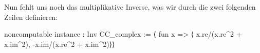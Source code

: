 \documentclass[10pt]{article}
\begin{document}
\noindent Nun fehlt uns noch das multiplikative Inverse, was wir durch die zwei folgenden Zeilen definieren:
\vspace{-0.1cm}
\begin{leancode}
noncomputable instance : Inv CC_complex :=
  ⟨ fun x => ⟨ x.re/(x.re^2 + x.im^2), -x.im/(x.re^2 + x.im^2)⟩⟩
\end{leancode}
\vspace{-0.1cm}
\end{document}
